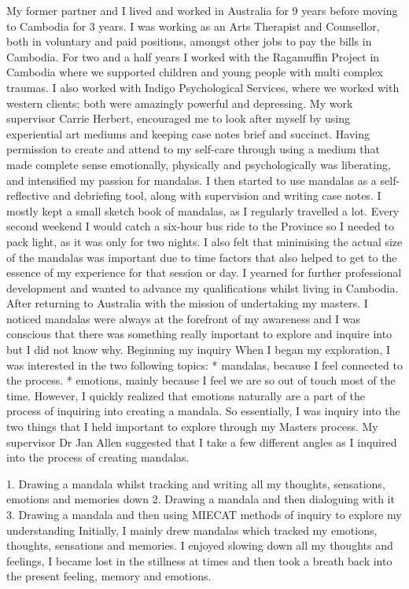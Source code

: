 My former partner and I lived and worked in Australia for 9 years before moving to Cambodia for 3 years. I was working as an Arts Therapist and Counsellor, both in voluntary and paid positions, amongst other jobs to pay the bills in Cambodia. For two and a half years I worked with the Ragamuffin Project in Cambodia where we supported children and young people with multi complex traumas. I also worked with Indigo Psychological Services, where we worked with western clients; both were amazingly powerful and depressing. 
My work supervisor Carrie Herbert, encouraged me to look after myself by using experiential art mediums and keeping case notes brief and succinct. Having permission to create and attend to my self-care through using a medium that made complete sense emotionally, physically and psychologically was liberating, and intensified my passion for mandalas. I then started to use mandalas as a self-reflective and debriefing tool, along with supervision and writing case notes. I mostly kept a small sketch book of mandalas, as I regularly travelled a lot. Every second weekend I would catch a six-hour bus ride to the Province so I needed to pack light, as it was only for two nights. I also felt that minimising the actual size of the mandalas was important due to time factors that also helped to get to the essence of my experience for that session or day.
I yearned for further professional development and wanted to advance my qualifications whilst living in Cambodia. After returning to Australia with the mission of undertaking my masters. I noticed mandalas were always at the forefront of my awareness and I was conscious that there was something really important to explore and inquire into but I did not know why.
Beginning my inquiry
When I began my exploration, I was interested in the two following topics:
* mandalas, because I feel connected to the process. 
* emotions, mainly because I feel we are so out of touch most of the time. 
However, I quickly realized that emotions naturally are a part of the process of inquiring into creating a mandala. So essentially, I was inquiry into the two things that I held important to explore through my Masters process.  
My supervisor Dr Jan Allen suggested that I take a few different angles as I inquired into the process of creating mandalas.

1. Drawing a mandala whilst tracking and writing all my thoughts, sensations, emotions and memories down 
2. Drawing a mandala and then dialoguing with it 
3. Drawing a mandala and then using MIECAT methods of inquiry to explore my understanding 
Initially, I mainly drew mandalas which tracked my emotions, thoughts, sensations and memories. I enjoyed slowing down all my thoughts and feelings, I became lost in the stillness at times and then took a breath back into the present feeling, memory and emotions. 

















